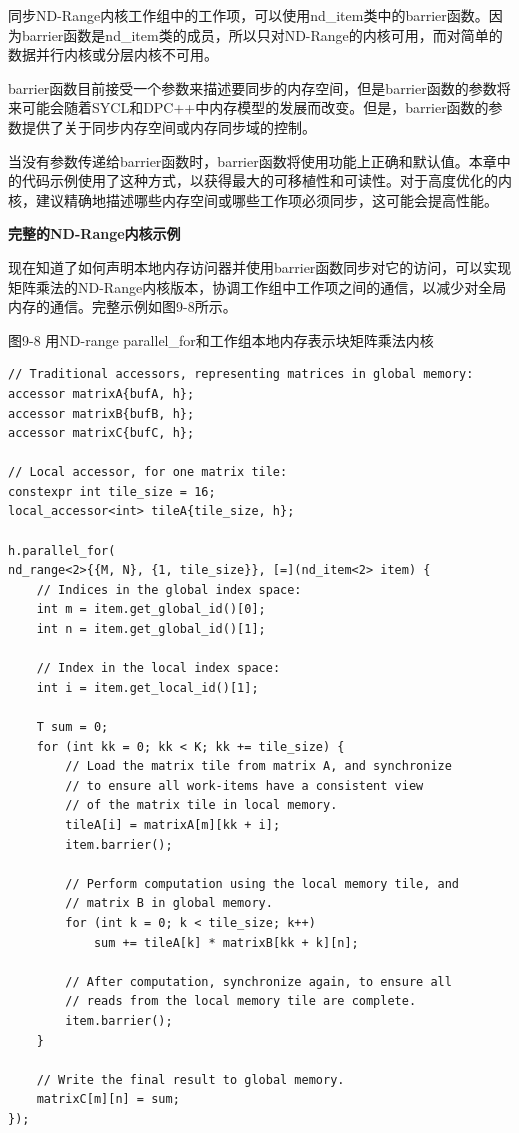 同步ND-Range内核工作组中的工作项，可以使用nd\_item类中的barrier函数。因为barrier函数是nd\_item类的成员，所以只对ND-Range的内核可用，而对简单的数据并行内核或分层内核不可用。\par

barrier函数目前接受一个参数来描述要同步的内存空间，但是barrier函数的参数将来可能会随着SYCL和DPC++中内存模型的发展而改变。但是，barrier函数的参数提供了关于同步内存空间或内存同步域的控制。\par

当没有参数传递给barrier函数时，barrier函数将使用功能上正确和默认值。本章中的代码示例使用了这种方式，以获得最大的可移植性和可读性。对于高度优化的内核，建议精确地描述哪些内存空间或哪些工作项必须同步，这可能会提高性能。\par

\hspace*{\fill} \par %
\textbf{完整的ND-Range内核示例}

现在知道了如何声明本地内存访问器并使用barrier函数同步对它的访问，可以实现矩阵乘法的ND-Range内核版本，协调工作组中工作项之间的通信，以减少对全局内存的通信。完整示例如图9-8所示。\par

\hspace*{\fill} \par %
图9-8 用ND-range parallel\_for和工作组本地内存表示块矩阵乘法内核
\begin{lstlisting}[caption={}]
// Traditional accessors, representing matrices in global memory:
accessor matrixA{bufA, h};
accessor matrixB{bufB, h};
accessor matrixC{bufC, h};

// Local accessor, for one matrix tile:
constexpr int tile_size = 16;
local_accessor<int> tileA{tile_size, h};

h.parallel_for(
nd_range<2>{{M, N}, {1, tile_size}}, [=](nd_item<2> item) {
	// Indices in the global index space:
	int m = item.get_global_id()[0];
	int n = item.get_global_id()[1];
	
	// Index in the local index space:
	int i = item.get_local_id()[1];
	
	T sum = 0;
	for (int kk = 0; kk < K; kk += tile_size) {
		// Load the matrix tile from matrix A, and synchronize
		// to ensure all work-items have a consistent view
		// of the matrix tile in local memory.
		tileA[i] = matrixA[m][kk + i];
		item.barrier();
		
		// Perform computation using the local memory tile, and
		// matrix B in global memory.
		for (int k = 0; k < tile_size; k++)
			sum += tileA[k] * matrixB[kk + k][n];
		
		// After computation, synchronize again, to ensure all
		// reads from the local memory tile are complete.
		item.barrier();
	}

	// Write the final result to global memory.
	matrixC[m][n] = sum;
});
\end{lstlisting}


